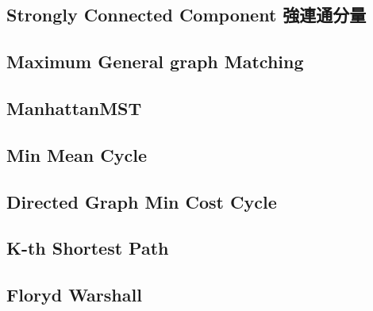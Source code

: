 \documentclass[a4paper,10pt,twocolumn,oneside]{article}
\begin{document}
\subsection{Strongly Connected Component 強連通分量}


%

\subsection{Maximum General graph Matching}


%

%

\subsection{ManhattanMST}


\subsection{Min Mean Cycle}


\subsection{Directed Graph Min Cost Cycle}


\subsection{K-th Shortest Path}


\subsection{Floryd Warshall}

\end{document}
